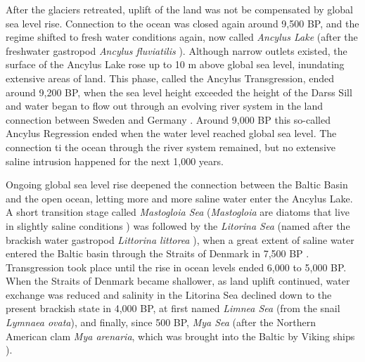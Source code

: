 After the glaciers retreated, uplift of the land was not be compensated by global sea level rise. Connection to the ocean was closed again around 9,500 BP, and the regime shifted to fresh water conditions again, now called \textit{Ancylus Lake} (after the freshwater gastropod \textit{Ancylus fluviatilis} \citep[][]{tikkanen2002}). Although narrow outlets existed, the surface of the Ancylus Lake rose up to 10 m above global sea level, inundating extensive areas of land. This phase, called the Ancylus Transgression, ended around 9,200 BP, when the sea level height exceeded the height of the Darss Sill and water began to flow out through an evolving river system in the land connection between Sweden and Germany \citep[][]{tikkanen2002}. Around 9,000 BP this so-called Ancylus Regression ended when the water level reached global sea level. The connection ti the ocean through the river system remained, but no extensive saline intrusion happened for the next 1,000 years.

Ongoing global sea level rise deepened the connection between the Baltic Basin and the open ocean, letting more and more saline water enter the Ancylus Lake. A short transition stage called \textit{Mastogloia Sea} (\textit{Mastogloia} are diatoms that live in slightly saline conditions \citep[][]{eronen2001}) was followed by the \textit{Litorina Sea} (named after the brackish water gastropod \textit{Littorina littorea} \citep[][]{eronen2001}), when a great extent of saline water entered the Baltic basin through the Straits of Denmark in 7,500 BP \citep[][]{bjoerk95}. Transgression took place until the rise in ocean levels ended 6,000 to 5,000 BP. When the Straits of Denmark became shallower, as land uplift continued, water exchange was reduced and salinity in the Litorina Sea declined down to the present brackish state in 4,000 BP, at first named \textit{Limnea Sea} (from the snail \textit{Lymnaea ovata}), and finally, since 500 BP, \textit{Mya Sea} (after the Northern American clam \textit{Mya arenaria}, which was brought into the Baltic by Viking ships \citep[][]{bjoerck2008}).

